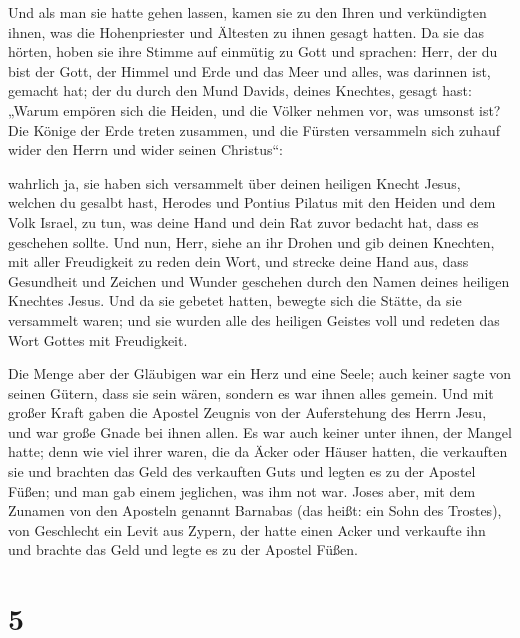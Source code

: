  Und als man sie hatte gehen lassen, kamen sie zu den
Ihren und verkündigten ihnen, was die Hohenpriester und Ältesten zu
ihnen gesagt hatten.  Da sie das hörten, hoben sie ihre
Stimme auf einmütig zu Gott und sprachen: Herr, der du bist der Gott,
der Himmel und Erde und das Meer und alles, was darinnen ist, gemacht
hat;  der du durch den Mund Davids, deines Knechtes,
gesagt hast: „Warum empören sich die Heiden, und die Völker nehmen vor,
was umsonst ist?  Die Könige der Erde treten zusammen,
und die Fürsten versammeln sich zuhauf wider den Herrn und wider seinen
Christus``:

 wahrlich ja, sie haben sich versammelt über deinen
heiligen Knecht Jesus, welchen du gesalbt hast, Herodes und Pontius
Pilatus mit den Heiden und dem Volk Israel,  zu tun, was
deine Hand und dein Rat zuvor bedacht hat, dass es geschehen sollte.
 Und nun, Herr, siehe an ihr Drohen und gib deinen
Knechten, mit aller Freudigkeit zu reden dein Wort,  und
strecke deine Hand aus, dass Gesundheit und Zeichen und Wunder geschehen
durch den Namen deines heiligen Knechtes Jesus.  Und da
sie gebetet hatten, bewegte sich die Stätte, da sie versammelt waren;
und sie wurden alle des heiligen Geistes voll und redeten das Wort
Gottes mit Freudigkeit.

 Die Menge aber der Gläubigen war ein Herz und eine
Seele; auch keiner sagte von seinen Gütern, dass sie sein wären, sondern
es war ihnen alles gemein.  Und mit großer Kraft gaben
die Apostel Zeugnis von der Auferstehung des Herrn Jesu, und war große
Gnade bei ihnen allen.  Es war auch keiner unter ihnen,
der Mangel hatte; denn wie viel ihrer waren, die da Äcker oder Häuser
hatten, die verkauften sie und brachten das Geld des verkauften Guts
 und legten es zu der Apostel Füßen; und man gab einem
jeglichen, was ihm not war.  Joses aber, mit dem Zunamen
von den Aposteln genannt Barnabas (das heißt: ein Sohn des Trostes), von
Geschlecht ein Levit aus Zypern,  der hatte einen Acker
und verkaufte ihn und brachte das Geld und legte es zu der Apostel
Füßen.

\hypertarget{section-4}{%
\section{5}\label{section-4}}


